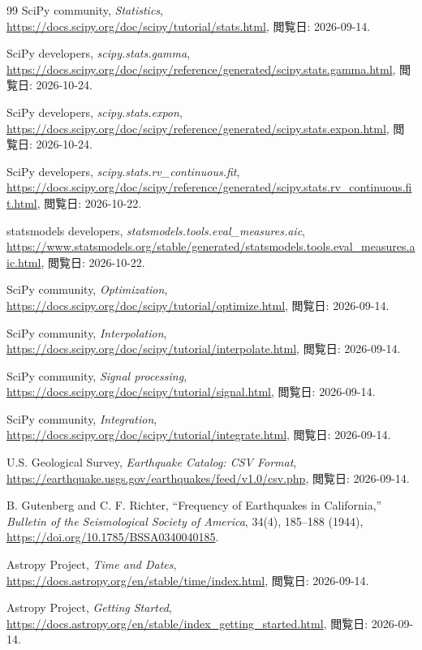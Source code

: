 \begin{thebibliography}{99}
SciPy community,
\textit{Statistics},
\url{https://docs.scipy.org/doc/scipy/tutorial/stats.html},
閲覧日: 2026-09-14.

SciPy developers,
\textit{scipy.stats.gamma},
\url{https://docs.scipy.org/doc/scipy/reference/generated/scipy.stats.gamma.html},
閲覧日: 2026-10-24.

SciPy developers,
\textit{scipy.stats.expon},
\url{https://docs.scipy.org/doc/scipy/reference/generated/scipy.stats.expon.html},
閲覧日: 2026-10-24.

SciPy developers,
\textit{scipy.stats.rv\_continuous.fit},
\url{https://docs.scipy.org/doc/scipy/reference/generated/scipy.stats.rv_continuous.fit.html},
閲覧日: 2026-10-22.

statsmodels developers,
\textit{statsmodels.tools.eval\_measures.aic},
\url{https://www.statsmodels.org/stable/generated/statsmodels.tools.eval_measures.aic.html},
閲覧日: 2026-10-22.

SciPy community,
\textit{Optimization},
\url{https://docs.scipy.org/doc/scipy/tutorial/optimize.html},
閲覧日: 2026-09-14.

SciPy community,
\textit{Interpolation},
\url{https://docs.scipy.org/doc/scipy/tutorial/interpolate.html},
閲覧日: 2026-09-14.

SciPy community,
\textit{Signal processing},
\url{https://docs.scipy.org/doc/scipy/tutorial/signal.html},
閲覧日: 2026-09-14.

SciPy community,
\textit{Integration},
\url{https://docs.scipy.org/doc/scipy/tutorial/integrate.html},
閲覧日: 2026-09-14.

U.S. Geological Survey,
\textit{Earthquake Catalog: CSV Format},
\url{https://earthquake.usgs.gov/earthquakes/feed/v1.0/csv.php},
閲覧日: 2026-09-14.

B. Gutenberg and C. F. Richter,
``Frequency of Earthquakes in California,''
\textit{Bulletin of the Seismological Society of America},
34(4), 185--188 (1944),
\url{https://doi.org/10.1785/BSSA0340040185}.

Astropy Project,
\textit{Time and Dates},
\url{https://docs.astropy.org/en/stable/time/index.html},
閲覧日: 2026-09-14.

Astropy Project,
\textit{Getting Started},
\url{https://docs.astropy.org/en/stable/index_getting_started.html},
閲覧日: 2026-09-14.


\end{thebibliography}
